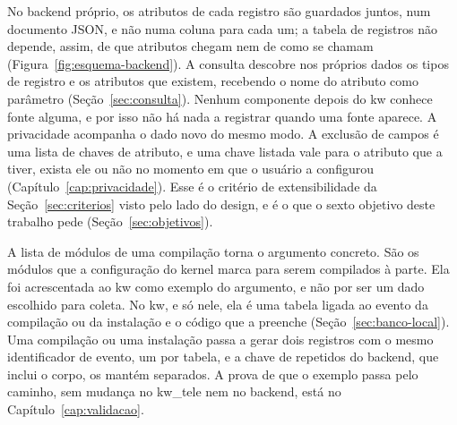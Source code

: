 

No backend próprio, os atributos de cada registro são guardados juntos, num
documento JSON, e não numa coluna para cada um; a tabela de registros não
depende, assim, de que atributos chegam nem de como se chamam
(Figura~\ref{fig:esquema-backend}). A consulta descobre nos próprios dados os
tipos de registro e os atributos que existem, recebendo o nome do atributo como
parâmetro (Seção~\ref{sec:consulta}). Nenhum componente depois do kw conhece
fonte alguma, e por isso não há nada a registrar quando uma fonte aparece. A
privacidade acompanha o dado novo do mesmo modo. A exclusão de campos é uma
lista de chaves de atributo, e uma chave listada vale para o atributo que a
tiver, exista ele ou não no momento em que o usuário a configurou
(Capítulo~\ref{cap:privacidade}). Esse é o critério de extensibilidade da
Seção~\ref{sec:criterios} visto pelo lado do design, e é o que o sexto objetivo
deste trabalho pede (Seção~\ref{sec:objetivos}).

A lista de módulos de uma compilação torna o argumento concreto. São os
módulos que a configuração do kernel marca para serem compilados à
parte. Ela foi acrescentada ao kw como exemplo do argumento, e não por ser um
dado escolhido para coleta. No kw, e só nele, ela é uma tabela ligada ao evento da compilação ou da
instalação e o código que a preenche (Seção~\ref{sec:banco-local}). Uma
compilação ou uma instalação passa a gerar dois registros com o mesmo
identificador de evento, um por tabela, e a chave de repetidos do backend, que
inclui o corpo, os mantém separados. A prova de que o exemplo passa pelo
caminho, sem mudança no kw\_tele nem no backend, está no
Capítulo~\ref{cap:validacao}.
